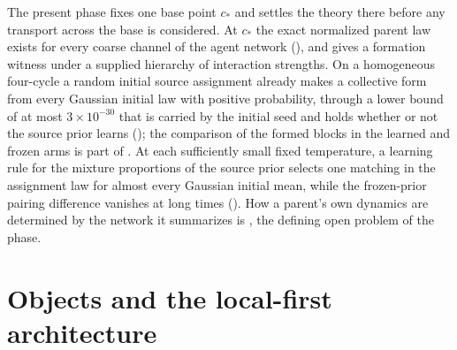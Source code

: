 The present phase fixes one base point $c_*$ and settles the theory there before any transport across the
base is considered. At $c_*$ the exact normalized parent law exists for every coarse channel of the
agent network (), and  gives
a formation witness under a supplied hierarchy of interaction strengths. On a homogeneous four-cycle a
random initial source assignment already makes a collective form from every Gaussian initial law with
positive probability, through a lower bound of at most $3\times10^{-30}$ that is carried by the initial seed and
holds whether or not the source prior learns (); the
comparison of the formed blocks in the learned and frozen arms is part of
. At each sufficiently small fixed temperature, a learning rule
for the mixture proportions of the source prior selects one matching in the assignment law for almost
every Gaussian initial mean, while the frozen-prior pairing difference vanishes at long times
(). How a
parent's own dynamics are determined by the network it summarizes is
, the defining open problem of the phase.

\section{Objects and the local-first architecture}
\label{sec:intro-objects}

